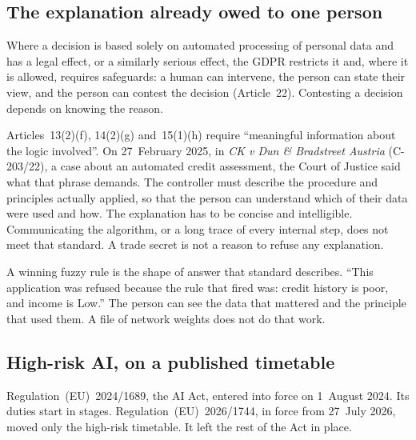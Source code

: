 \documentclass[11pt]{article}
\begin{document}
\subsection{The explanation already owed to one person}

Where a decision is based solely on automated processing of personal data and has a legal effect, or a similarly serious effect, the GDPR restricts it and, where it is allowed, requires safeguards: a human can intervene, the person can state their view, and the person can contest the decision (Article~22). Contesting a decision depends on knowing the reason.

Articles~13(2)(f), 14(2)(g) and~15(1)(h) require ``meaningful information about the logic involved''. On 27~February 2025, in \emph{CK v Dun \& Bradstreet Austria} (C-203/22), a case about an automated credit assessment, the Court of Justice said what that phrase demands. The controller must describe the procedure and principles actually applied, so that the person can understand which of their data were used and how. The explanation has to be concise and intelligible. Communicating the algorithm, or a long trace of every internal step, does not meet that standard. A trade secret is not a reason to refuse any explanation.

A winning fuzzy rule is the shape of answer that standard describes. ``This application was refused because the rule that fired was: credit history is poor, and income is Low.'' The person can see the data that mattered and the principle that used them. A file of network weights does not do that work.

\subsection{High-risk AI, on a published timetable}

Regulation~(EU)~2024/1689, the AI Act, entered into force on 1~August 2024. Its duties start in stages. Regulation~(EU)~2026/1744, in force from 27~July 2026, moved only the high-risk timetable. It left the rest of the Act in place.
\end{document}
